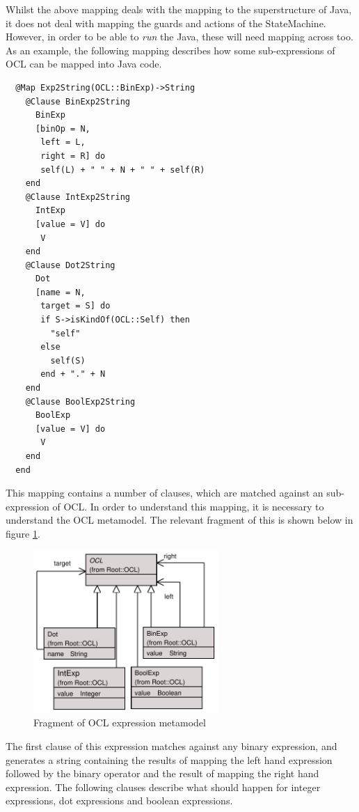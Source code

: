 Whilst the above mapping deals with the mapping to the
superstructure of Java, it does not deal with mapping the guards
and actions of the StateMachine. However, in order to be able to
{\em run} the Java, these will need mapping across too. As an
example, the following mapping describes how some sub-expressions
of OCL can be mapped into Java code.


\begin{lstlisting}
  @Map Exp2String(OCL::BinExp)->String
    @Clause BinExp2String
      BinExp
      [binOp = N,
       left = L,
       right = R] do
       self(L) + " " + N + " " + self(R)
    end
    @Clause IntExp2String
      IntExp
      [value = V] do
       V
    end
    @Clause Dot2String
      Dot
      [name = N,
       target = S] do
       if S->isKindOf(OCL::Self) then
         "self"
       else
         self(S)
       end + "." + N
    end
    @Clause BoolExp2String
      BoolExp
      [value = V] do
       V
    end
  end
\end{lstlisting}
This mapping contains a number of clauses, which are matched
against an sub-expression of OCL. In order to understand this
mapping, it is necessary to understand the OCL metamodel. The
relevant fragment of this is shown below in figure
\ref{oclfragment}.

\begin{figure}[htb]
\begin{center}
\includegraphics[width=7cm]{Mappings/figures/oclfragment.pdf}
\caption{Fragment of OCL expression metamodel} \label{oclfragment}
\end{center}
\end{figure}

The first clause of this expression matches against any binary
expression, and generates a string containing the results of
mapping the left hand expression followed by the binary operator
and the result of mapping the right hand expression. The following
clauses describe what should happen for integer expressions, dot
expressions and boolean expressions.

